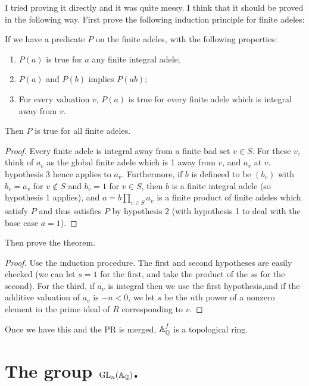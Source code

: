 I tried proving it directly and it was quite messy. I think that it should be proved in the
following way. First prove the following induction principle for finite adeles:
\begin{lemma}
    \label{DedekindDomain.FiniteAdeleRing.mul_induction_on}
    \leanok
    If we have a predicate $P$ on the finite adeles, with the following properties:
  \begin{enumerate}
    \item $P(a)$ is true for $a$ any finite integral adele;
    \item $P(a)$ and $P(b)$ implies $P(ab)$;
    \item For every valuation $v$, $P(a)$ is true for every finite adele which is integral
      away from $v$.
  \end{enumerate}
  Then $P$ is true for all finite adeles.
\end{lemma}
\begin{proof}
  Every finite adele is integral away from a finite bad set $v\in S$. For these $v$,
  think of $a_v$ as the global finite adele which is 1 away from $v$, and $a_v$ at $v$.
  hypothesis 3 hence applies to $a_v$. Furthermore, if $b$ is defineed to be $(b_v)$
  with $b_v=a_v$ for $v\not\in S$ and $b_v=1$ for $v\in S$, then $b$ is a finite integral
  adele (so hypothesis 1 applies), and $a=b\prod_{v\in S}a_v$ is a finite product of
  finite adeles which satisfy $P$ and thus satisfies $P$ by hypothesis 2 (with hypothesis 1
  to deal with the base case $a=1$).
\end{proof}

Then prove the theorem.
\begin{proof}

  Use the induction procedure. The first and second hypotheses are easily checked
  (we can let $s=1$ for the first, and take the product of the $s$s for the second).
  For the third, if $a_v$ is integral then we use the first hypothesis,and if the
  additive valuation of $a_v$ is $-n<0$, we let $s$ be the $n$th power of a nonzero
  element in the prime ideal of $R$ corresponding to $v$.
\end{proof}

Once we have this and the PR is merged, $\mathbb{A}_{\mathbb{Q}}^f$ is a topological ring.

\section[The adelic general linear group]{The group $\operatorname{GL}_n(\mathbb{A}_{\mathbb{Q}})$.}

